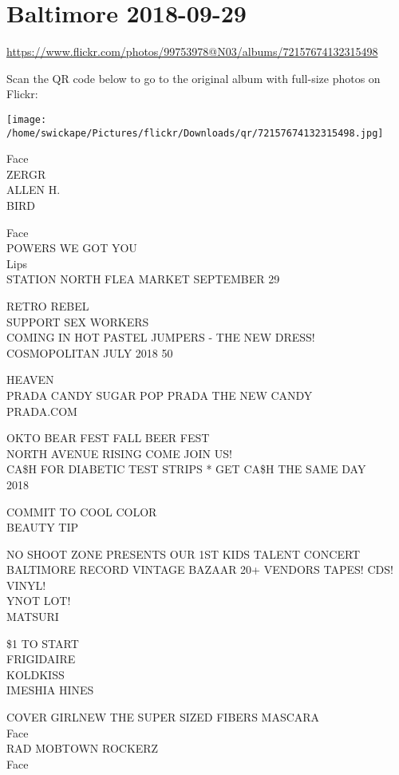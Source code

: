 \documentclass[10pt,letterpaper]{article}
\begin{document}
\section*{Baltimore 2018-09-29}

\url{https://www.flickr.com/photos/99753978@N03/albums/72157674132315498}

Scan the QR code below to go to the original album with full-size photos on Flickr:

\texttt{[image: /home/swickape/Pictures/flickr/Downloads/qr/72157674132315498.jpg]}


Face\\
ZERGR\\
ALLEN H.\\
BIRD

Face\\
POWERS WE GOT YOU\\
Lips\\
STATION NORTH FLEA MARKET SEPTEMBER 29

RETRO REBEL\\
SUPPORT SEX WORKERS\\
COMING IN HOT PASTEL JUMPERS {-} THE NEW DRESS!\\
COSMOPOLITAN JULY 2018 50

HEAVEN\\
PRADA CANDY SUGAR POP PRADA THE NEW CANDY\\
PRADA.COM

OKTO BEAR FEST FALL BEER FEST\\
NORTH AVENUE RISING COME JOIN US!\\
CA\$H FOR DIABETIC TEST STRIPS * GET CA\$H THE SAME DAY\\
2018

COMMIT TO COOL COLOR\\
BEAUTY TIP

NO SHOOT ZONE PRESENTS OUR 1ST KIDS TALENT CONCERT\\
BALTIMORE RECORD VINTAGE BAZAAR 20+ VENDORS TAPES!  CDS!  VINYL!\\
YNOT LOT!\\
MATSURI

\$1 TO START\\
FRIGIDAIRE\\
KOLDKISS\\
IMESHIA HINES

COVER GIRLNEW THE SUPER SIZED FIBERS MASCARA\\
Face\\
RAD MOBTOWN ROCKERZ\\
Face
\end{document}
